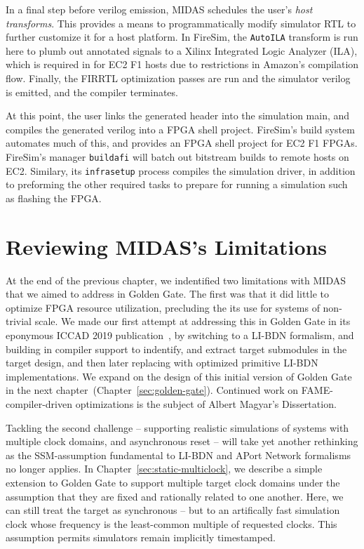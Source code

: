 In a final step before verilog emission, MIDAS schedules the user's
\emph{host transforms}.  This provides a means to programmatically modify simulator RTL to further
customize it for a host platform. In FireSim, the \texttt{AutoILA}
transform is run here to plumb out annotated signals to a Xilinx Integrated
Logic Analyzer (ILA), which is required in for EC2 F1 hosts due to
restrictions in Amazon's compilation flow. Finally, the FIRRTL optimization passes are run
and the simulator verilog is emitted, and the compiler terminates.

At this point, the user links the generated header into the simulation
main, and compiles the generated verilog into a FPGA shell project.
FireSim's build system automates much of this, and provides an FPGA shell
project for EC2 F1 FPGAs. FireSim's manager \texttt{buildafi} will batch
out bitstream builds to remote hosts on EC2. Similary, its
\texttt{infrasetup} process compiles the simulation driver, in addition to
preforming the other required tasks to prepare for running a simulation
such as flashing the FPGA.

\section{Reviewing MIDAS's Limitations}

At the end of the previous chapter, we indentified two limitations with MIDAS
that we aimed to address in Golden Gate. The first was that it did little to
optimize FPGA resource utilization, precluding the its use for systems of
non-trivial scale. We made our first attempt at addressing this in Golden Gate
in its eponymous ICCAD 2019 publication~\cite{Golden Gate}, by switching to a
LI-BDN formalism, and building in compiler support to indentify, and extract
target submodules in the target design, and then later replacing with
optimized primitive LI-BDN implementations. We expand on the design of this initial version of Golden Gate
in the next chapter~(Chapter~\ref{sec:golden-gate}). Continued work on FAME-compiler-driven optimizations
is the subject of Albert Magyar's Dissertation.

Tackling the second challenge -- supporting realistic simulations of systems
with multiple clock domains, and asynchronous reset -- will take yet another
rethinking as the SSM-assumption fundamental to LI-BDN and APort Network
formalisms no longer applies. In Chapter~\ref{sec:static-multiclock}, we
describe a simple extension to Golden Gate to support multiple target clock
domains under the assumption that they are fixed and rationally related to one another.
Here, we can still treat the target as synchronous -- but to an
artifically fast simulation clock whose frequency is the least-common multiple
of requested clocks. This assumption permits simulators remain implicitly
timestamped.

